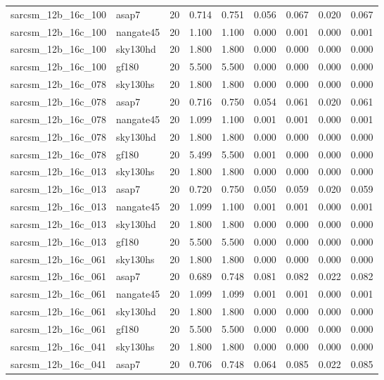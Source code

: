 \begin{tabular}{llrrrrrrr}
sarcsm\_12b\_16c\_100 & asap7 & 20 & 0.714 & 0.751 & 0.056 & 0.067 & 0.020 & 0.067 \\
sarcsm\_12b\_16c\_100 & nangate45 & 20 & 1.100 & 1.100 & 0.000 & 0.001 & 0.000 & 0.001 \\
sarcsm\_12b\_16c\_100 & sky130hd & 20 & 1.800 & 1.800 & 0.000 & 0.000 & 0.000 & 0.000 \\
sarcsm\_12b\_16c\_100 & gf180 & 20 & 5.500 & 5.500 & 0.000 & 0.000 & 0.000 & 0.000 \\
sarcsm\_12b\_16c\_078 & sky130hs & 20 & 1.800 & 1.800 & 0.000 & 0.000 & 0.000 & 0.000 \\
sarcsm\_12b\_16c\_078 & asap7 & 20 & 0.716 & 0.750 & 0.054 & 0.061 & 0.020 & 0.061 \\
sarcsm\_12b\_16c\_078 & nangate45 & 20 & 1.099 & 1.100 & 0.001 & 0.001 & 0.000 & 0.001 \\
sarcsm\_12b\_16c\_078 & sky130hd & 20 & 1.800 & 1.800 & 0.000 & 0.000 & 0.000 & 0.000 \\
sarcsm\_12b\_16c\_078 & gf180 & 20 & 5.499 & 5.500 & 0.001 & 0.000 & 0.000 & 0.000 \\
sarcsm\_12b\_16c\_013 & sky130hs & 20 & 1.800 & 1.800 & 0.000 & 0.000 & 0.000 & 0.000 \\
sarcsm\_12b\_16c\_013 & asap7 & 20 & 0.720 & 0.750 & 0.050 & 0.059 & 0.020 & 0.059 \\
sarcsm\_12b\_16c\_013 & nangate45 & 20 & 1.099 & 1.100 & 0.001 & 0.001 & 0.000 & 0.001 \\
sarcsm\_12b\_16c\_013 & sky130hd & 20 & 1.800 & 1.800 & 0.000 & 0.000 & 0.000 & 0.000 \\
sarcsm\_12b\_16c\_013 & gf180 & 20 & 5.500 & 5.500 & 0.000 & 0.000 & 0.000 & 0.000 \\
sarcsm\_12b\_16c\_061 & sky130hs & 20 & 1.800 & 1.800 & 0.000 & 0.000 & 0.000 & 0.000 \\
sarcsm\_12b\_16c\_061 & asap7 & 20 & 0.689 & 0.748 & 0.081 & 0.082 & 0.022 & 0.082 \\
sarcsm\_12b\_16c\_061 & nangate45 & 20 & 1.099 & 1.099 & 0.001 & 0.001 & 0.000 & 0.001 \\
sarcsm\_12b\_16c\_061 & sky130hd & 20 & 1.800 & 1.800 & 0.000 & 0.000 & 0.000 & 0.000 \\
sarcsm\_12b\_16c\_061 & gf180 & 20 & 5.500 & 5.500 & 0.000 & 0.000 & 0.000 & 0.000 \\
sarcsm\_12b\_16c\_041 & sky130hs & 20 & 1.800 & 1.800 & 0.000 & 0.000 & 0.000 & 0.000 \\
sarcsm\_12b\_16c\_041 & asap7 & 20 & 0.706 & 0.748 & 0.064 & 0.085 & 0.022 & 0.085 \\

\end{tabular}
